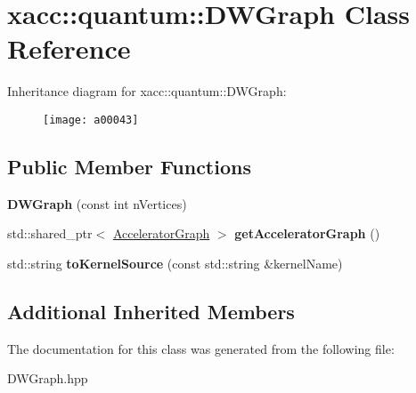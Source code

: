 \hypertarget{a00043}{}\section{xacc\+:\+:quantum\+:\+:D\+W\+Graph Class Reference}
\label{a00043}
Inheritance diagram for xacc\+:\+:quantum\+:\+:D\+W\+Graph\+:\begin{figure}[H]
\begin{center}
\leavevmode
\texttt{[image: a00043]}
\end{center}
\end{figure}
\subsection*{Public Member Functions}
\begin{DoxyCompactItemize}
\item 
{\bfseries D\+W\+Graph} (const int n\+Vertices)\hypertarget{a00043_adc891c7ec39fbb480d9102c3b0458e4c}{}\label{a00043_adc891c7ec39fbb480d9102c3b0458e4c}

\item 
std\+::shared\+\_\+ptr$<$ \hyperlink{a00064}{Accelerator\+Graph} $>$ {\bfseries get\+Accelerator\+Graph} ()\hypertarget{a00043_acdce3a79dfc4e296c215ac95f6fef8f5}{}\label{a00043_acdce3a79dfc4e296c215ac95f6fef8f5}

\item 
std\+::string {\bfseries to\+Kernel\+Source} (const std\+::string \&kernel\+Name)\hypertarget{a00043_a636bf17193ae20ae6355755dacafdf98}{}\label{a00043_a636bf17193ae20ae6355755dacafdf98}

\end{DoxyCompactItemize}
\subsection*{Additional Inherited Members}


The documentation for this class was generated from the following file\+:\begin{DoxyCompactItemize}
\item 
D\+W\+Graph.\+hpp\end{DoxyCompactItemize}
